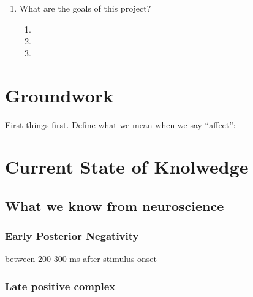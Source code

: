 \documentclass[12pt,letterpaper,table,svgnames,dvipsnames]{article}
\begin{document}
\begin{enumerate}[noitemsep]
    \item What are the goals of this project?
        \begin{enumerate}[noitemsep]
            \item 
            \item 
            \item 
        \end{enumerate}
\end{enumerate}




\section{Groundwork}
First things first. Define what we mean when we say ``affect'': 



\section{Current State of Knolwedge}

\subsection{What we know from neuroscience}

\subsubsection{Early Posterior Negativity}

between 200-300 ms after stimulus onset

\subsubsection{Late positive complex}
\end{document}

